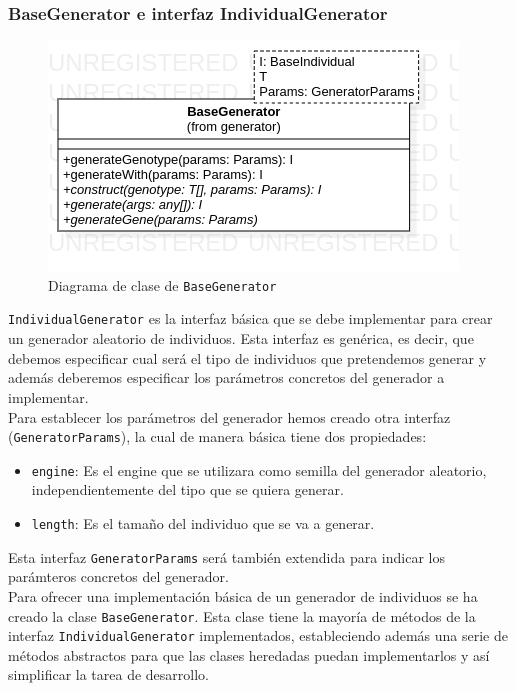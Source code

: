 \subsubsection{BaseGenerator e interfaz IndividualGenerator}

\begin{figure}[ht]
    \centering
    \includegraphics[scale=0.5]{mem/images/cap-4/4.2.3(Generador)/BaseGenerator.png}
    \caption{Diagrama de clase de \texttt{BaseGenerator}}
    \label{fig:generator-uml}
\end{figure}

\texttt{IndividualGenerator} es la interfaz básica que se debe implementar para crear un generador aleatorio de individuos. Esta interfaz es genérica, es decir, que debemos especificar cual será el tipo de individuos que pretendemos generar y además deberemos especificar los parámetros concretos del generador a implementar. \\

Para establecer los parámetros del generador hemos creado otra interfaz (\texttt{GeneratorParams}), la cual de manera básica tiene dos propiedades: 

\begin{itemize}
    \item \texttt{engine}: Es el engine que se utilizara como semilla del generador aleatorio, independientemente del tipo que se quiera generar.
    \item \texttt{length}: Es el tamaño del individuo que se va a generar.
\end{itemize}

Esta interfaz \texttt{GeneratorParams} será también extendida para indicar los parámteros concretos del generador. \\

Para ofrecer una implementación básica de un generador de individuos se ha creado la clase \texttt{BaseGenerator}. Esta clase tiene la mayoría de métodos de la interfaz \texttt{IndividualGenerator} implementados, estableciendo además una serie de métodos abstractos para que las clases heredadas puedan implementarlos y así simplificar la tarea de desarrollo. \\

